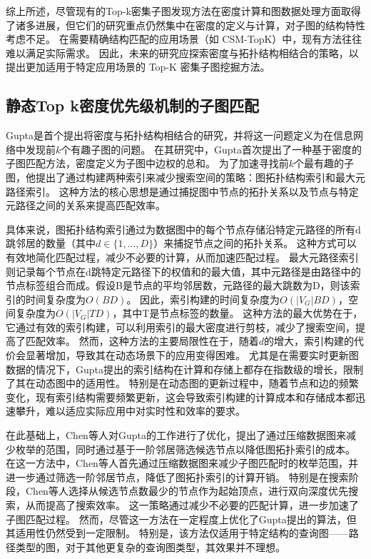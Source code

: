 综上所述，尽管现有的Top-k密集子图发现方法在密度计算和图数据处理方面取得了诸多进展，但它们的研究重点仍然集中在密度的定义与计算，对子图的结构特性考虑不足。
在需要精确结构匹配的应用场景（如 CSM-TopK）中，现有方法往往难以满足实际需求。
因此，未来的研究应探索密度与拓扑结构相结合的策略，以提出更加适用于特定应用场景的 Top-K 密集子图挖掘方法。
\subsection{静态Top k密度优先级机制的子图匹配}
Gupta\cite{static-topk-Gupta-DBLP:conf/icde/GuptaGYCH14}是首个提出将密度与拓扑结构相结合的研究，并将这一问题定义为在信息网络中发现前$k$个有趣子图的问题。
在其研究中，Gupta首次提出了一种基于密度的子图匹配方法，密度定义为子图中边权的总和。
为了加速寻找前$k$个最有趣的子图，他提出了通过构建两种索引来减少搜索空间的策略：图拓扑结构索引和最大元路径索引。
这种方法的核心思想是通过捕捉图中节点的拓扑关系以及节点与特定元路径之间的关系来提高匹配效率。

具体来说，图拓扑结构索引通过为数据图中的每个节点存储沿特定元路径的所有d跳邻居的数量（其中$d \in \{1,\dots,D\}$）来捕捉节点之间的拓扑关系。
这种方式可以有效地简化匹配过程，减少不必要的计算，从而加速匹配过程。
最大元路径索引则记录每个节点在d跳特定元路径下的权值和的最大值，其中元路径是由路径中的节点标签组合而成。假设B是节点的平均邻居数，元路径的最大跳数为D，则该索引的时间复杂度为$O(BD)$。
因此，索引构建的时间复杂度为$O(|V_G|BD)$，空间复杂度为$O(|V_G|TD)$，其中T是节点标签的数量。
这种方法的最大优势在于，它通过有效的索引构建，可以利用索引的最大密度进行剪枝，减少了搜索空间，提高了匹配效率。
然而，这种方法的主要局限性在于，随着$d$的增大，索引构建的代价会显著增加，导致其在动态场景下的应用变得困难。
尤其是在需要实时更新图数据的情况下，Gupta提出的索引结构在计算和存储上都存在指数级的增长，限制了其在动态图中的适用性。
特别是在动态图的更新过程中，随着节点和边的频繁变化，现有索引结构需要频繁更新，这会导致索引构建的计算成本和存储成本都迅速攀升，难以适应实际应用中对实时性和效率的要求。


在此基础上，Chen\cite{static-topk-Chen-DBLP:journals/ijprai/ChenLCTL18}等人对Gupta的工作进行了优化，提出了通过压缩数据图来减少枚举的范围，同时通过基于一阶邻居筛选候选节点以降低图拓扑索引的成本。
在这一方法中，Chen等人首先通过压缩数据图来减少子图匹配时的枚举范围，并进一步通过筛选一阶邻居节点，降低了图拓扑索引的计算开销。
特别是在搜索阶段，Chen\cite{static-topk-Chen-DBLP:journals/ijprai/ChenLCTL18}等人选择从候选节点数最少的节点作为起始顶点，进行双向深度优先搜索，从而提高了搜索效率。
这一策略通过减少不必要的匹配计算，进一步加速了子图匹配过程。
然而，尽管这一方法在一定程度上优化了Gupta提出的算法，但其适用性仍然受到一定限制。
特别是，该方法仅适用于特定结构的查询图——路径类型的图，对于其他更复杂的查询图类型，其效果并不理想。

